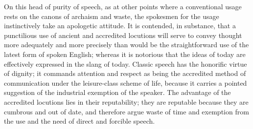 \documentclass[12pt]{report}
\begin{document}
On this head of purity of speech, as at other points where a
conventional usage rests on the canons of archaism and waste, the
spokesmen for the usage instinctively take an apologetic attitude. It
is contended, in substance, that a punctilious use of ancient and
accredited locutions will serve to convey thought more adequately and
more precisely than would be the straightforward use of the latest form
of spoken English; whereas it is notorious that the ideas of today are
effectively expressed in the slang of today. Classic speech has the
honorific virtue of dignity; it commands attention and respect as being
the accredited method of communication under the leisure-class scheme
of life, because it carries a pointed suggestion of the industrial
exemption of the speaker. The advantage of the accredited locutions lies
in their reputability; they are reputable because they are cumbrous and
out of date, and therefore argue waste of time and exemption from the
use and the need of direct and forcible speech.
\end{document}
